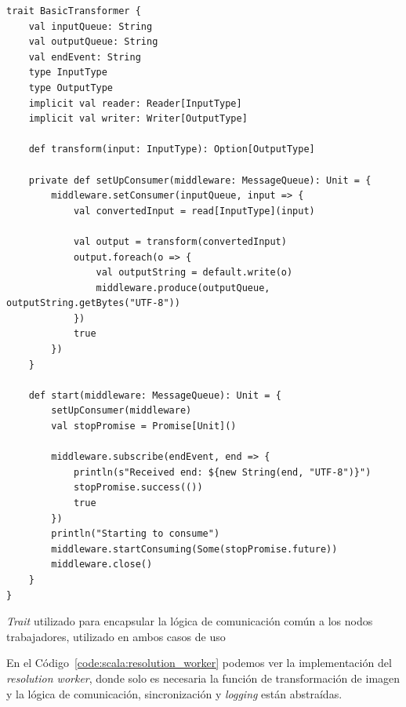 \documentclass[11pt]{article}
\newcommand{\english}[1]{\textit{#1}}
\begin{document}
\begin{listing}[h]
\begin{verbatim}
trait BasicTransformer {
    val inputQueue: String
    val outputQueue: String
    val endEvent: String
    type InputType
    type OutputType
    implicit val reader: Reader[InputType]
    implicit val writer: Writer[OutputType]

    def transform(input: InputType): Option[OutputType]

    private def setUpConsumer(middleware: MessageQueue): Unit = {
        middleware.setConsumer(inputQueue, input => {
            val convertedInput = read[InputType](input)

            val output = transform(convertedInput)
            output.foreach(o => {
                val outputString = default.write(o)
                middleware.produce(outputQueue, outputString.getBytes("UTF-8"))
            })
            true
        })
    }

    def start(middleware: MessageQueue): Unit = {
        setUpConsumer(middleware)
        val stopPromise = Promise[Unit]()

        middleware.subscribe(endEvent, end => {
            println(s"Received end: ${new String(end, "UTF-8")}")
            stopPromise.success(())
            true
        })
        println("Starting to consume")
        middleware.startConsuming(Some(stopPromise.future))
        middleware.close()
    }
}
\end{verbatim}
\caption{\english{Trait} utilizado para encapsular la lógica de comunicación común a los nodos trabajadores, utilizado en ambos casos de uso}
\label{code:scala:basic_transformer}
\end{listing}

En el Código~\ref{code:scala:resolution_worker} podemos ver la implementación del \english{resolution worker}, donde solo es necesaria la función de transformación de imagen y la lógica de comunicación, sincronización y \english{logging} están abstraídas.
\end{document}
